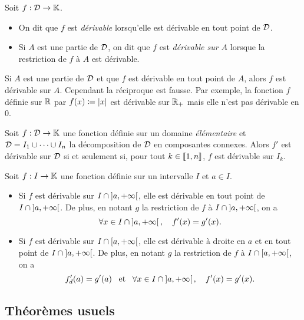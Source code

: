 \documentclass{magnolia}
\begin{document}
\begin{definition}[utile=-3]
Soit $f:\mathcal{D}\to\mathbb{K}$.
\begin{itemize}
\item On dit que $f$ est \emph{dérivable} lorsqu'elle est dérivable en tout point
  de $\mathcal{D}$.
\item Si $A$ est une partie de $\mathcal{D}$, on dit que $f$ est \emph{dérivable sur $A$} lorsque
  la restriction de $f$ à $A$ est dérivable.
\end{itemize}
\end{definition}

\begin{remarqueUnique}
\remarque Si $A$ est une partie de $\mathcal{D}$ et que $f$ est dérivable en tout point de $A$,
  alors $f$ est dérivable sur $A$. Cependant la réciproque est fausse. Par exemple,
  la fonction $f$ définie sur $\mathbb{R}$ par $f(x)\coloneqq\left|x\right|$ est dérivable sur $\mathbb{R}_+$ mais elle
  n'est pas dérivable en 0.
\end{remarqueUnique}

\begin{proposition}
Soit $f:\mathcal{D}\to\mathbb{K}$ une fonction définie sur un domaine \emph{élémentaire} et
$\mathcal{D}=I_1\cup\cdots\cup I_n$ la décomposition de $\mathcal{D}$ en composantes connexes. Alors
$f'$ est dérivable sur $\mathcal{D}$ si et seulement si, pour tout $k\in\left\llbracket 1,n\right\rrbracket$, $f$
est dérivable sur $I_k$.
\end{proposition}

\begin{proposition}
Soit $f:I\to\mathbb{K}$ une fonction définie sur un intervalle $I$ et $a\in I$.
\begin{itemize}
\item Si $f$ est dérivable sur $I\cap\left]a,+\infty\right[$, elle est dérivable en tout
  point de $I\cap\left]a,+\infty\right[$. De plus, en notant $g$ la restriction de 
  $f$ à $I\cap\left]a,+\infty\right[$, on a
  \[\forall x\in I\cap\left]a,+\infty\right[,\quad f'(x)=g'(x).\]
\item Si $f$ est dérivable sur $I\cap\left[a,+\infty\right[$, elle est dérivable à droite
  en $a$ et en tout point de $I\cap\left]a,+\infty\right[$. De plus, en notant $g$ la 
  restriction de $f$ à $I\cap\left[a,+\infty\right[$, on a
  \[f_d'(a)=g'(a) \quad\!\text{et}\quad\! \forall x\in I\cap\left]a,+\infty\right[,\quad f'(x)=g'(x).\]
\end{itemize}
\end{proposition}

\subsection{Théorèmes usuels}
\end{document}
